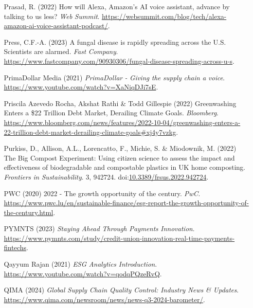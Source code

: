 \documentclass[
  letterpaper,
  DIV=11,
  numbers=noendperiod]{scrartcl}
\newlength{\cslhangindent}
\newenvironment{CSLReferences}[2] %
 {\begin{list}{}{%
  \setlength{\itemindent}{0pt}
  \setlength{\leftmargin}{0pt}
  \setlength{\parsep}{0pt}
  \ifodd #1
   \setlength{\leftmargin}{\cslhangindent}
   \setlength{\itemindent}{-1\cslhangindent}
  \fi
  \setlength{\itemsep}{#2\baselineskip}}}
 {\end{list}}
\begin{document}
\begin{CSLReferences}{0}{1}
Prasad, R. (2022) How will {Alexa}, {Amazon}'s {AI} voice assistant,
advance by talking to us less? \emph{Web Summit}.
\url{https://websummit.com/blog/tech/alexa-amazon-ai-voice-assistant-podcast/}.

Press, C.F.-A. (2023) A fungal disease is rapidly spreading across the
{U}.{S}. {Scientists} are alarmed. \emph{Fast Company}.
\url{https://www.fastcompany.com/90930306/fungal-disease-spreading-across-u-s}.

PrimaDollar Media (2021) \emph{{PrimaDollar} - {Giving} the supply chain
a voice}. \url{https://www.youtube.com/watch?v=XaNiqDJi7sE}.

Priscila Azevedo Rocha, Akshat Rathi \& Todd Gillespie (2022)
Greenwashing {Enters} a \$22 {Trillion Debt Market}, {Derailing Climate
Goals}. \emph{Bloomberg}.
\url{https://www.bloomberg.com/news/features/2022-10-04/greenwashing-enters-a-22-trillion-debt-market-derailing-climate-goals\#xj4y7vzkg}.

Purkiss, D., Allison, A.L., Lorencatto, F., Michie, S. \& Miodownik, M.
(2022) The {Big Compost Experiment}: {Using} citizen science to assess
the impact and effectiveness of biodegradable and compostable plastics
in {UK} home composting. \emph{Frontiers in Sustainability}. 3, 942724.
doi:\href{https://doi.org/10.3389/frsus.2022.942724}{10.3389/frsus.2022.942724}.

PWC (2020) {2022 - The growth opportunity of the century}. \emph{PwC}.
\url{https://www.pwc.lu/en/sustainable-finance/esg-report-the-growth-opportunity-of-the-century.html}.

PYMNTS (2023) \emph{Staying {Ahead Through Payments Innovation}}.
\url{https://www.pymnts.com/study/credit-union-innovation-real-time-payments-fintechs}.

Qayyum Rajan (2021) \emph{{ESG Analytics Introduction}}.
\url{https://www.youtube.com/watch?v=qodqPQzeRvQ}.

QIMA (2024) \emph{Global {Supply Chain Quality Control}: {Industry News}
\& {Updates}}.
\url{https://www.qima.com/newsroom/news/news-q3-2024-barometer/}.


\end{CSLReferences}
\end{document}
